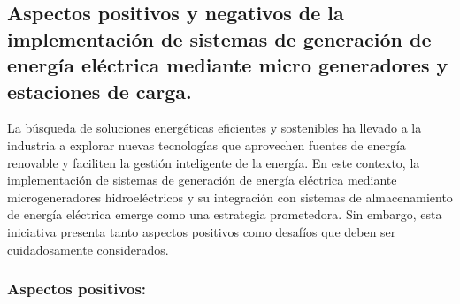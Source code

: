 \documentclass[11pt]{article}
\begin{document}
            \subsection{Aspectos positivos y negativos de la implementación de sistemas de
            generación de energía eléctrica mediante micro generadores y estaciones de
            carga.}

            La búsqueda de soluciones energéticas eficientes y sostenibles ha llevado a la industria a
            explorar nuevas tecnologías que aprovechen fuentes de energía renovable y faciliten la
            gestión inteligente de la energía. En este contexto, la implementación de sistemas de
            generación de energía eléctrica mediante microgeneradores hidroeléctricos y su integración
            con sistemas de almacenamiento de energía eléctrica emerge como una estrategia
            prometedora. Sin embargo, esta iniciativa presenta tanto aspectos positivos como desafíos
            que deben ser cuidadosamente considerados.

            
            \subsubsection{Aspectos positivos:}
\end{document}
